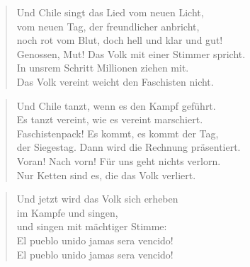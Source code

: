\documentclass[9pt,a4paper,oneside, onecolumn]{article}
\begin{document}
\begin{verse}
 Und Chile singt das Lied vom neuen Licht,\\
 vom neuen Tag, der freundlicher anbricht,\\
   noch rot vom Blut, doch hell und klar und gut!\\
   Genossen, Mut! Das Volk mit einer Stimmer spricht.\\
   In unsrem Schritt Millionen ziehen mit.\\
   Das Volk vereint weicht den Faschisten nicht.\\
\end{verse}

\begin{verse}
 Und Chile tanzt, wenn es den Kampf geführt.\\
 Es tanzt vereint, wie es vereint marschiert.\\
   Faschistenpack! Es kommt, es kommt der Tag,\\
   der Siegestag. Dann wird die Rechnung präsentiert.\\
   Voran! Nach vorn! Für uns geht nichts verlorn.\\
   Nur Ketten sind es, die das Volk verliert.\\
\end{verse}

\begin{verse}

Und jetzt wird das Volk sich erheben\\
im Kampfe und singen,\\
und singen mit mächtiger Stimme:\\

El pueblo unido jamas sera vencido!\\
El pueblo unido jamas sera vencido!\\
\end{verse}
\end{document}
